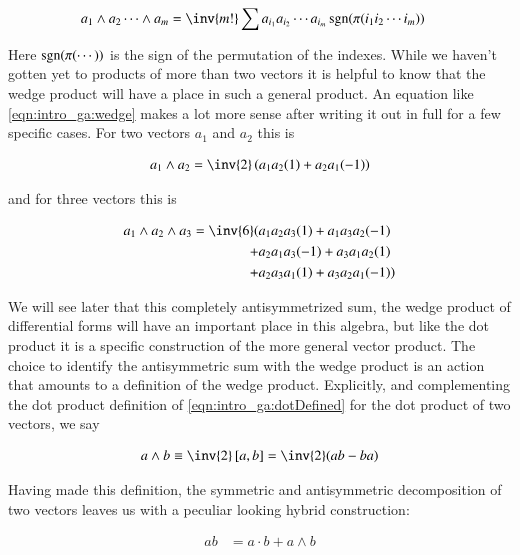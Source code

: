 \begin{align}\label{eqn:intro_ga:wedge}
a_1 \wedge a_2 \cdots \wedge a_m
&= \inv{m!} \sum a_{i_1} a_{i_2} \cdots a_{i_m} \sgn(\pi(i_1 i_2 \cdots i_m))
\end{align}

Here $\operatorname{sgn}(\pi(\cdots))$ is the sign of the permutation of the indexes.  While we haven't gotten yet to products of more than two vectors it is helpful to know that the wedge product will have a place in such a general product.   An equation like \ref{eqn:intro_ga:wedge} makes a lot more sense after writing it out in full for a few specific cases.  For two vectors $a_1$ and $a_2$ this is

\begin{align}\label{eqn:intro_ga:wedgeTwo}
a_1 \wedge a_2 = \inv{2}
\left( a_1 a_2 (1) + a_2 a_1 (-1) \right)
\end{align}

and for three vectors this is

\begin{align*}
a_1 \wedge a_2 \wedge a_3 = \inv{6}
(
&a_1 a_2 a_3 (1) + a_1 a_3 a_2 (-1) \\
+&a_2 a_1 a_3 (-1) + a_3 a_1 a_2 (1) \\
+&a_2 a_3 a_1 (1) + a_3 a_2 a_1 (-1) )
\end{align*}

We will see later that this completely antisymmetrized sum, the wedge product of differential forms will have an important place in this algebra, but like the dot product it is a specific construction of the more general vector product.  The choice to identify the antisymmetric sum with the wedge product is an action that amounts to a definition of the wedge product.  Explicitly, and complementing
the dot product definition of \ref{eqn:intro_ga:dotDefined} for the dot product
of two vectors, we say

\begin{align}\label{eqn:intro_ga:wedgeDefined}
a \wedge b \equiv \inv{2} \antisymmetric{a}{b} = \inv{2} ( a b - b a )
\end{align}

Having made this definition, the symmetric and antisymmetric decomposition of two vectors leaves us with a peculiar looking hybrid construction:

\begin{align}\label{eqn:intro_ga:dotPlusWedge}
a b %
&= a \cdot b + a \wedge b
\end{align}

